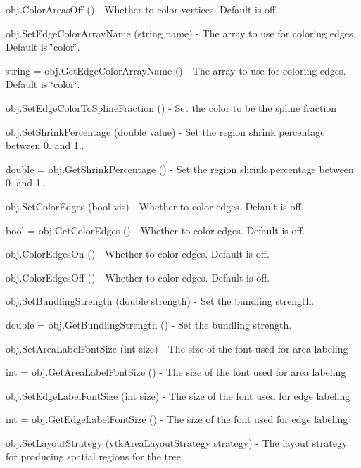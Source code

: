 \begin{DoxyItemize}
\item {\ttfamily obj.\-Color\-Areas\-Off ()} -\/ Whether to color vertices. Default is off.  
\item {\ttfamily obj.\-Set\-Edge\-Color\-Array\-Name (string name)} -\/ The array to use for coloring edges. Default is \char`\"{}color\char`\"{}.  
\item {\ttfamily string = obj.\-Get\-Edge\-Color\-Array\-Name ()} -\/ The array to use for coloring edges. Default is \char`\"{}color\char`\"{}.  
\item {\ttfamily obj.\-Set\-Edge\-Color\-To\-Spline\-Fraction ()} -\/ Set the color to be the spline fraction  
\item {\ttfamily obj.\-Set\-Shrink\-Percentage (double value)} -\/ Set the region shrink percentage between 0. and 1..  
\item {\ttfamily double = obj.\-Get\-Shrink\-Percentage ()} -\/ Set the region shrink percentage between 0. and 1..  
\item {\ttfamily obj.\-Set\-Color\-Edges (bool vis)} -\/ Whether to color edges. Default is off.  
\item {\ttfamily bool = obj.\-Get\-Color\-Edges ()} -\/ Whether to color edges. Default is off.  
\item {\ttfamily obj.\-Color\-Edges\-On ()} -\/ Whether to color edges. Default is off.  
\item {\ttfamily obj.\-Color\-Edges\-Off ()} -\/ Whether to color edges. Default is off.  
\item {\ttfamily obj.\-Set\-Bundling\-Strength (double strength)} -\/ Set the bundling strength.  
\item {\ttfamily double = obj.\-Get\-Bundling\-Strength ()} -\/ Set the bundling strength.  
\item {\ttfamily obj.\-Set\-Area\-Label\-Font\-Size (int size)} -\/ The size of the font used for area labeling  
\item {\ttfamily int = obj.\-Get\-Area\-Label\-Font\-Size ()} -\/ The size of the font used for area labeling  
\item {\ttfamily obj.\-Set\-Edge\-Label\-Font\-Size (int size)} -\/ The size of the font used for edge labeling  
\item {\ttfamily int = obj.\-Get\-Edge\-Label\-Font\-Size ()} -\/ The size of the font used for edge labeling  
\item {\ttfamily obj.\-Set\-Layout\-Strategy (vtk\-Area\-Layout\-Strategy strategy)} -\/ The layout strategy for producing spatial regions for the tree.  

\end{DoxyItemize}
